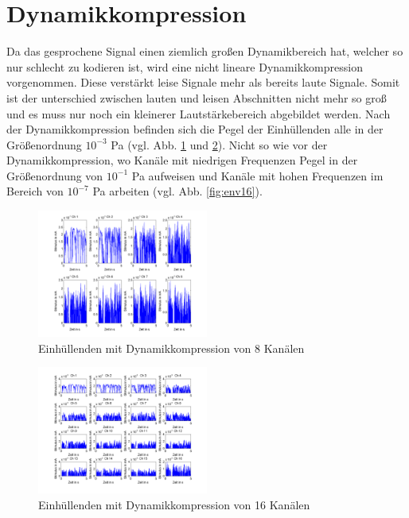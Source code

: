 \documentclass[conference]{IEEEtran}
\begin{document}
\section{Dynamikkompression}
\begin{compactenum}[a)]
\item Da das gesprochene Signal einen ziemlich großen Dynamikbereich hat, welcher so nur schlecht zu kodieren ist, wird eine nicht lineare Dynamikkompression vorgenommen. Diese verstärkt leise Signale mehr als bereits laute Signale. Somit ist der unterschied zwischen lauten und leisen Abschnitten nicht mehr so groß und es muss nur noch ein kleinerer Lautstärkebereich abgebildet werden. Nach der Dynamikkompression befinden sich die Pegel der Einhüllenden alle in der Größenordnung $10^{-3}$ Pa (vgl. Abb. \ref{fig:dyn8} und \ref{fig:dyn16}). Nicht so wie vor der Dynamikkompression, wo Kanäle mit niedrigen Frequenzen Pegel in der Größenordnung von $10^{-1}$ Pa aufweisen und Kanäle mit hohen Frequenzen im Bereich von $10^{-7}$ Pa arbeiten (vgl. Abb. \ref{fig:env16}).
\begin{figure}[h!]
	\vspace{-5pt}
	\centering
	\includegraphics[width=0.5\textwidth]{img/dyn8.png}
	\vspace{-10pt}
	\caption{Einhüllenden mit Dynamikkompression von 8 Kanälen}
	\vspace{-10pt}
	\label{fig:dyn8}
\end{figure}

\begin{figure}
	\vspace{-5pt}
	\centering
	\includegraphics[width=0.5\textwidth]{img/dyn16.png}
	\vspace{-10pt}
	\caption{Einhüllenden mit Dynamikkompression von 16 Kanälen}
	\vspace{-10pt}
	\label{fig:dyn16}
\end{figure}


\end{compactenum}
\end{document}
